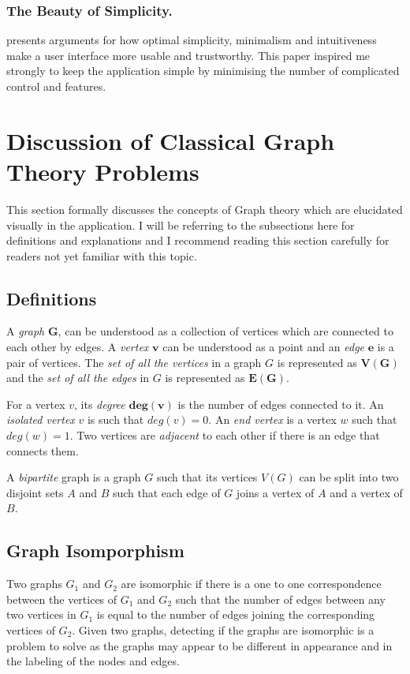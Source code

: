 \subsubsection{The Beauty of Simplicity.}
\cite{Karvonen2000} presents arguments for how optimal simplicity, minimalism and
intuitiveness make a user interface more usable and trustworthy. This paper inspired me strongly to keep the application simple by minimising the number of complicated
control and features.

\section{Discussion of Classical Graph Theory Problems}
This section formally discusses the concepts of Graph theory which are
elucidated visually in the application.  I will be referring to the subsections here for definitions and explanations and I recommend reading this section carefully for readers not yet familiar with this topic.

\subsection{Definitions}
\label{graphtheory: definitions}
A \emph{graph} $\boldsymbol{G}$, can be understood as a collection of vertices which are
connected to each other by edges.  A \emph{vertex} $\boldsymbol{v}$ can be understood as a
point and an \emph{edge} $\boldsymbol{e}$ is a pair of vertices.  The \emph{set of all the vertices}
in a graph $G$ is represented as $\boldsymbol{V(G)}$ and the \emph{set of all the
edges} in $G$ is represented as $\boldsymbol{E(G)}$.

For a vertex $v$, its \emph{degree} $\boldsymbol{deg(v)}$ is the number of edges
connected to it.  An \emph{isolated vertex} $v$ is such that $deg(v) = 0$. An
\emph{end vertex} is a vertex $w$ such that $deg(w) = 1$.  Two vertices are
\emph{adjacent} to each other if there is an edge that connects them.

A \emph{bipartite} graph is a graph $G$ such that its vertices $V(G)$ can
be split into two disjoint sets $A$ and $B$ such that each edge of $G$ joins a
vertex of $A$ and a vertex of $B$. \cite{Newman10} 


\subsection{Graph Isomporphism}
Two graphs $G_1$ and $G_2$ are isomorphic if there is a one to one correspondence
between the vertices of $G_1$ and $G_2$ such that the number of edges between any
two vertices in $G_1$ is equal to the number of edges joining the corresponding
vertices of $G_2$.  Given two graphs, detecting if the graphs are isomorphic is
a problem to solve as the graphs may appear to be different in appearance and
in the labeling of the nodes and edges. \cite{Newman10}

